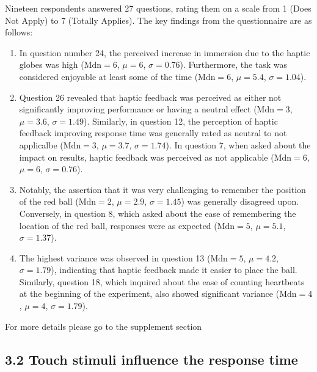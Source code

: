 \documentclass[12pt,oneside,openright]{report}
\begin{document}
    Nineteen respondents answered 27 questions, rating them on a scale from 1 (Does Not Apply) to 7 (Totally Applies). The key findings from the questionnaire are as follows:
    
    \begin{enumerate}
        \item In question number 24, the perceived increase in immersion due to the haptic globes was high ($\text{Mdn} = 6$, $\mu = 6$, $\sigma = 0.76$). Furthermore, the task was considered enjoyable at least some of the time ($\text{Mdn} = 6$, $\mu = 5.4$, $\sigma = 1.04$).
        
        \item Question 26 revealed that haptic feedback was perceived as either not significantly improving performance or having a neutral effect ($\text{Mdn} = 3$, $\mu = 3.6$, $\sigma = 1.49$). Similarly, in question 12, the perception of haptic feedback improving response time was generally rated as neutral to not applicalbe ($\text{Mdn} = 3$, $\mu = 3.7$, $\sigma = 1.74$). In question 7, when asked about the impact on results, haptic feedback was perceived as not applicable ($\text{Mdn} = 6$, $\mu = 6$, $\sigma = 0.76$).
    
        \item Notably, the assertion that it was very challenging to remember the position of the red ball ($\text{Mdn} = 2$, $\mu = 2.9$, $\sigma = 1.45$) was generally disagreed upon. Conversely, in question 8, which asked about the ease of remembering the location of the red ball, responses were as expected ($\text{Mdn} = 5$, $\mu = 5.1$, $\sigma = 1.37$).
    
        \item The highest variance was observed in question 13 ($\text{Mdn} = 5$, $\mu = 4.2$, $\sigma = 1.79$), indicating that haptic feedback made it easier to place the ball. Similarly, question 18, which inquired about the ease of counting heartbeats at the beginning of the experiment, also showed significant variance ($\text{Mdn} = 4$, $\mu = 4$, $\sigma = 1.79$). 
        
    \end{enumerate}
    
    For more details please go to the supplement section 

    
\subsection*{3.2 Touch stimuli influence the response time}
\end{document}
